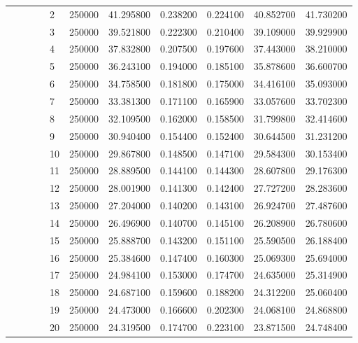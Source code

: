 \begin{tabular}{llllllrrrrr}
\cline{5-11}
 &  &  &  & 2 & 250000 & 41.295800 & 0.238200 & 0.224100 & 40.852700 & 41.730200 \\
\cline{5-11}
 &  &  &  & 3 & 250000 & 39.521800 & 0.222300 & 0.210400 & 39.109000 & 39.929900 \\
\cline{5-11}
 &  &  &  & 4 & 250000 & 37.832800 & 0.207500 & 0.197600 & 37.443000 & 38.210000 \\
\cline{5-11}
 &  &  &  & 5 & 250000 & 36.243100 & 0.194000 & 0.185100 & 35.878600 & 36.600700 \\
\cline{5-11}
 &  &  &  & 6 & 250000 & 34.758500 & 0.181800 & 0.175000 & 34.416100 & 35.093000 \\
\cline{5-11}
 &  &  &  & 7 & 250000 & 33.381300 & 0.171100 & 0.165900 & 33.057600 & 33.702300 \\
\cline{5-11}
 &  &  &  & 8 & 250000 & 32.109500 & 0.162000 & 0.158500 & 31.799800 & 32.414600 \\
\cline{5-11}
 &  &  &  & 9 & 250000 & 30.940400 & 0.154400 & 0.152400 & 30.644500 & 31.231200 \\
\cline{5-11}
 &  &  &  & 10 & 250000 & 29.867800 & 0.148500 & 0.147100 & 29.584300 & 30.153400 \\
\cline{5-11}
 &  &  &  & 11 & 250000 & 28.889500 & 0.144100 & 0.144300 & 28.607800 & 29.176300 \\
\cline{5-11}
 &  &  &  & 12 & 250000 & 28.001900 & 0.141300 & 0.142400 & 27.727200 & 28.283600 \\
\cline{5-11}
 &  &  &  & 13 & 250000 & 27.204000 & 0.140200 & 0.143100 & 26.924700 & 27.487600 \\
\cline{5-11}
 &  &  &  & 14 & 250000 & 26.496900 & 0.140700 & 0.145100 & 26.208900 & 26.780600 \\
\cline{5-11}
 &  &  &  & 15 & 250000 & 25.888700 & 0.143200 & 0.151100 & 25.590500 & 26.188400 \\
\cline{5-11}
 &  &  &  & 16 & 250000 & 25.384600 & 0.147400 & 0.160300 & 25.069300 & 25.694000 \\
\cline{5-11}
 &  &  &  & 17 & 250000 & 24.984100 & 0.153000 & 0.174700 & 24.635000 & 25.314900 \\
\cline{5-11}
 &  &  &  & 18 & 250000 & 24.687100 & 0.159600 & 0.188200 & 24.312200 & 25.060400 \\
\cline{5-11}
 &  &  &  & 19 & 250000 & 24.473000 & 0.166600 & 0.202300 & 24.068100 & 24.868800 \\
\cline{5-11}
 &  &  &  & 20 & 250000 & 24.319500 & 0.174700 & 0.223100 & 23.871500 & 24.748400 \\

\end{tabular}
